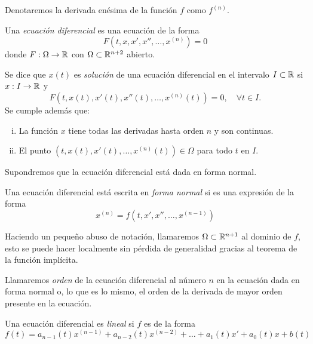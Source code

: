 \documentclass[../ecuaciones_diferenciales.tex]{subfiles}
\begin{document}
\begin{notation}
	Denotaremos la derivada enésima de la función \(f\) como \(f^{(n)}\).
\end{notation}

\begin{definition}
	Una \emph{ecuación diferencial} es una ecuación de la forma
	\[F(t, x, x', x'', \dots, x^{(n)}) = 0\]
	donde \(F : \Omega \to \mathbb{R}\) con \(\Omega \subset \mathbb{R}^{n + 2}\) abierto.
\end{definition}

\begin{definition}
	Se dice que \(x(t)\) es \emph{solución} de una ecuación diferencial en el
	intervalo
	\(I \subset \mathbb{R}\) si \(x : I \to \mathbb{R}\) y
	\[F(t, x(t), x'(t), x''(t), \dots, x^{(n)}(t)) = 0, \quad \forall t \in I.\]
	Se cumple además que:
	\begin{enumerate}[(i)]
		\item La función \(x\) tiene todas las derivadas hasta orden \(n\) y son
		      continuas.
		\item El punto \((t, x(t), x'(t), \dots, x^{(n)}(t)) \in \Omega\) para
		      todo \(t\) en \(I\).
	\end{enumerate}
\end{definition}

Supondremos que la ecuación diferencial está dada en forma normal.

\begin{definition}
	Una ecuación diferencial está escrita en \emph{forma normal} si es una
	expresión de la forma
	\[x^{(n)} = f(t, x', x'', \dots, x^{(n - 1)})\]
\end{definition}

Haciendo un pequeño abuso de notación, llamaremos \(\Omega \subset \mathbb{R}^{n + 1}\)
al dominio de \(f\), esto se puede hacer localmente sin pérdida de generalidad
gracias al teorema de la función implícita.

\begin{definition}[Orden]
	Llamaremos \emph{orden} de la ecuación diferencial al número \(n\) en la
	ecuación dada en forma normal o, lo que es lo mismo,
	el orden de la derivada de mayor orden presente en la ecuación.
\end{definition}

\begin{definition}
	Una ecuación diferencial es \emph{lineal} si \(f\) es de la forma
	\[f(t) = a_{n - 1}(t)x^{(n - 1)} + a_{n - 2}(t)x^{(n - 2)} +
		\dots + a_1(t)x' + a_0(t)x + b(t)\]
\end{definition}
\end{document}
